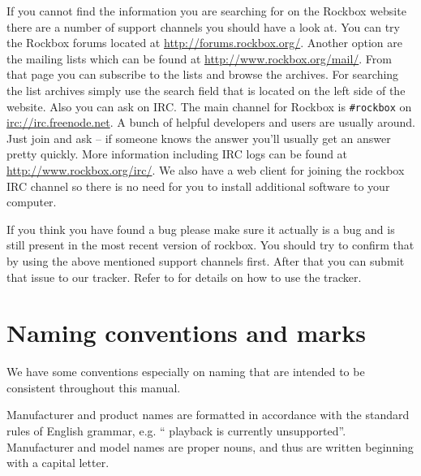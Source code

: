 If you cannot find the information you are searching for on the Rockbox
website there are a number of support channels you should have a look at.
You can try the Rockbox forums located at \url{http://forums.rockbox.org/}.
Another option are the mailing lists which can be found at
\url{http://www.rockbox.org/mail/}. From that page you can subscribe to the
lists and browse the archives. For searching the list archives simply use
the search field that is located on the left side of the website.
Also you can ask on IRC. The main channel for Rockbox is \texttt{\#rockbox}
on \url{irc://irc.freenode.net}. A bunch of helpful developers and users
are usually around. Just join and ask -- if someone knows the answer you'll
usually get an answer pretty quickly. More information including IRC logs
can be found at \url{http://www.rockbox.org/irc/}. We also have a web client
for joining the rockbox IRC channel so there is no need for you
to install additional software to your computer.

If you think you have found a bug please make sure it actually is a bug and is
still present in the most recent version of rockbox. You should try to
confirm that by using the above mentioned support channels first. After that
you can submit that issue to our tracker. Refer to 
for details on how to use the tracker.


\section{Naming conventions and marks}
We have some conventions especially on naming that are intended to be
consistent throughout this manual.

Manufacturer and product names are formatted in accordance with the standard
rules of English grammar, e.g. ``\playerman{} playback is currently
unsupported''. Manufacturer and model names are proper nouns, and
thus are written beginning with a capital letter.


